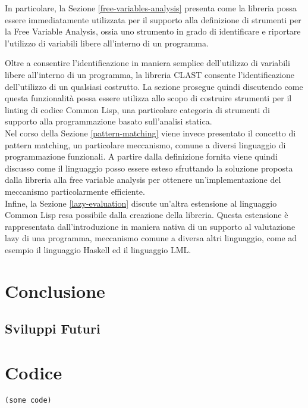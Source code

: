\documentclass{book}
\begin{document}

In particolare, la Sezione \ref{free-variables-analysis} presenta come la
libreria possa essere immediatamente utilizzata per il supporto alla definizione
di strumenti per la Free Variable Analysis, ossia uno strumento in grado di
identificare e riportare l'utilizzo di variabili libere all'interno di un
programma.

Oltre a consentire l'identificazione in maniera semplice dell'utilizzo di
variabili libere all'interno di un programma, la libreria CLAST consente
l'identificazione dell'utilizzo di un qualsiasi costrutto. La sezione prosegue
quindi discutendo come questa funzionalità possa essere utilizza allo scopo di
costruire strumenti per il linting di codice Common Lisp, una particolare
categoria di strumenti di supporto alla programmazione basato sull'analisi
statica.\\

Nel corso della Sezione \ref{pattern-matching} viene invece presentato il
concetto di pattern matching, un particolare meccanismo, comune a diversi
linguaggio di programmazione funzionali. A partire dalla definizione fornita
viene quindi discusso come il linguaggio posso essere esteso sfruttando la
soluzione proposta dalla libreria alla free variable analysis per ottenere
un'implementazione del meccanismo particolarmente efficiente.\\

Infine, la Sezione \ref{lazy-evaluation} discute un'altra estensione al
linguaggio Common Lisp resa possibile dalla creazione della libreria. Questa
estensione è rappresentata dall'introduzione in maniera nativa di un supporto al
valutazione lazy di una programma, meccanismo comune a diversa altri linguaggio,
come ad esempio il linguaggio Haskell ed il linguaggio LML.





\chapter{Conclusione}
\section{Sviluppi Futuri}

\appendix

\chapter{Codice}

\begin{lstlisting}
(some code)
\end{lstlisting}

\printbibliography[filter=papers,title={Articoli Citati}]
\printbibliography[type=book,title={Bibliografia}]
\printbibliography[type=misc,title={Sitografia}]
\end{document}
